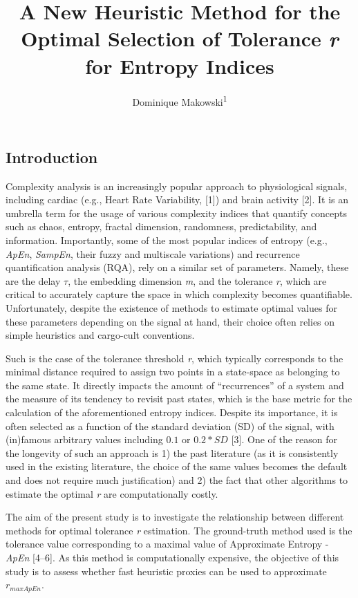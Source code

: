 \documentclass[
  man,floatsintext]{apa6}
\title{\textbf{A New Heuristic Method for the Optimal Selection of Tolerance \emph{r} for Entropy Indices}}
\author{Dominique Makowski\textsuperscript{1}}
\date{}
\affiliation{\vspace{0.5cm}\textsuperscript{1} School of Social Sciences, Nanyang Technological University, Singapore}
\begin{document}
\maketitle

\hypertarget{introduction}{%
\subsection{Introduction}\label{introduction}}

Complexity analysis is an increasingly popular approach to physiological signals, including cardiac (e.g., Heart Rate Variability, {[}1{]}) and brain activity {[}2{]}. It is an umbrella term for the usage of various complexity indices that quantify concepts such as chaos, entropy, fractal dimension, randomness, predictability, and information. Importantly, some of the most popular indices of entropy (e.g., \emph{ApEn}, \emph{SampEn}, their fuzzy and multiscale variations) and recurrence quantification analysis (RQA), rely on a similar set of parameters. Namely, these are the delay \(\tau\), the embedding dimension \emph{m}, and the tolerance \emph{r}, which are critical to accurately capture the space in which complexity becomes quantifiable. Unfortunately, despite the existence of methods to estimate optimal values for these parameters depending on the signal at hand, their choice often relies on simple heuristics and cargo-cult conventions.

Such is the case of the tolerance threshold \emph{r}, which typically corresponds to the minimal distance required to assign two points in a state-space as belonging to the same state. It directly impacts the amount of ``recurrences'' of a system and the measure of its tendency to revisit past states, which is the base metric for the calculation of the aforementioned entropy indices. Despite its importance, it is often selected as a function of the standard deviation (SD) of the signal, with (in)famous arbitrary values including \(0.1\) or \(0.2*SD\) {[}3{]}. One of the reason for the longevity of such an approach is 1) the past literature (as it is consistently used in the existing literature, the choice of the same values becomes the default and does not require much justification) and 2) the fact that other algorithms to estimate the optimal \emph{r} are computationally costly.

The aim of the present study is to investigate the relationship between different methods for optimal tolerance \emph{r} estimation. The ground-truth method used is the tolerance value corresponding to a maximal value of Approximate Entropy - \emph{ApEn} {[}4--6{]}. As this method is computationally expensive, the objective of this study is to assess whether fast heuristic proxies can be used to approximate \(r_{maxApEn}\).
\end{document}
